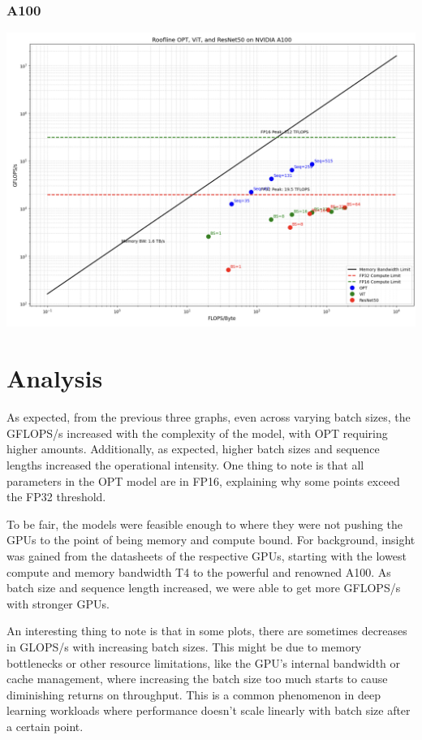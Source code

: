 \documentclass[11pt]{article}
\begin{document}
\subsubsection*{A100}
\includegraphics[width=14cm]{roofline/a100_roofline.png}

\section*{Analysis}
As expected, from the previous three graphs, even across varying batch sizes, the GFLOPS/s increased with the complexity of the model, with OPT requiring higher amounts. Additionally, as expected, higher batch sizes and sequence lengths increased the operational intensity. One thing to note is that all parameters in the OPT model are in FP16, explaining why some points exceed the FP32 threshold.

To be fair, the models were feasible enough to where they were not pushing the GPUs to the point of being memory and compute bound. For background, insight was gained from the datasheets of the respective GPUs, starting with the lowest compute and memory bandwidth T4 to the powerful and renowned A100. As batch size and sequence length increased, we were able to get more GFLOPS/s with stronger GPUs.

An interesting thing to note is that in some plots, there are sometimes decreases in GLOPS/s with increasing batch sizes. This might be due to memory bottlenecks or other resource limitations, like the GPU's internal bandwidth or cache management, where increasing the batch size too much starts to cause diminishing returns on throughput. This is a common phenomenon in deep learning workloads where performance doesn’t scale linearly with batch size after a certain point.
\end{document}
